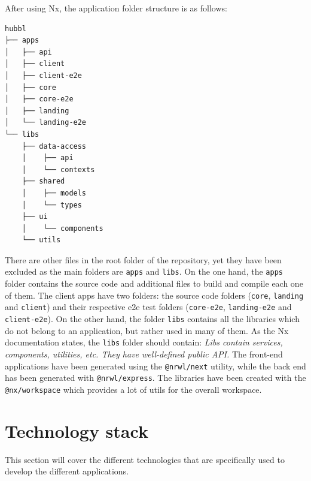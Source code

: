 \documentclass[a4paper, 12pt, oneside]{book}
\begin{document}
After using Nx, the application folder structure is as follows:
\begin{verbatim}
hubbl
├── apps
│   ├── api
│   ├── client
│   ├── client-e2e
│   ├── core
│   ├── core-e2e
│   ├── landing
│   └── landing-e2e
└── libs
    ├── data-access
    │    ├── api
    │    └── contexts
    ├── shared
    │    ├── models
    │    └── types
    ├── ui
    │    └── components
    └── utils
\end{verbatim}
There are other files in the root folder of the repository, yet they have been excluded as the main folders are \texttt{apps} and \texttt{libs}. On the one hand, the \texttt{apps} folder contains the source code and additional files to build and compile each one of them. The client apps have two folders: the source code folders (\texttt{core}, \texttt{landing} and \texttt{client}) and their respective e2e test folders (\texttt{core-e2e}, \texttt{landing-e2e} and \texttt{client-e2e}). On the other hand, the folder \texttt{libs} contains all the libraries which do not belong to an application, but rather used in many of them. As the Nx documentation states, the \texttt{libs} folder should contain: \emph{Libs contain services, components, utilities, etc. They have well-defined public API.} The front-end applications have been generated using the \texttt{@nrwl/next} utility, while the back end has been generated with \texttt{@nrwl/express}. The libraries have been created with the \texttt{@nx/workspace} which provides a lot of utils for the overall workspace.
\section{Technology stack}
This section will cover the different technologies that are specifically used to develop the different applications.
\end{document}
